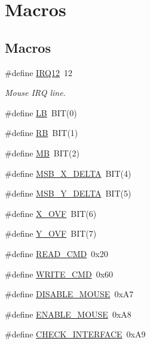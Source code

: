 \hypertarget{group__Mouse}{}\section{Macros}
\label{group__Mouse}
\subsection*{Macros}
\begin{DoxyCompactItemize}
\item 
\#define \hyperlink{group__Mouse_ga57276d1481230d81d2bba849f935ce5a}{I\+R\+Q12}~12
\begin{DoxyCompactList}\small\item\em Mouse I\+RQ line. \end{DoxyCompactList}\item 
\#define \hyperlink{group__Mouse_gacc55daa58d88a3612f2ef74a6abbe97f}{LB}~B\+IT(0)
\item 
\#define \hyperlink{group__Mouse_ga171160a766f85c8816b898ed24d28408}{RB}~B\+IT(1)
\item 
\#define \hyperlink{group__Mouse_gaa6b38d492364d98453284934ed7caee9}{MB}~B\+IT(2)
\item 
\#define \hyperlink{group__Mouse_gab3682a7593eea6b3a98269c3105714b1}{M\+S\+B\+\_\+\+X\+\_\+\+D\+E\+L\+TA}~B\+IT(4)
\item 
\#define \hyperlink{group__Mouse_ga73e7f39e782c9d57707ff7a518d031a6}{M\+S\+B\+\_\+\+Y\+\_\+\+D\+E\+L\+TA}~B\+IT(5)
\item 
\#define \hyperlink{group__Mouse_ga858379c2252a71bc12dd9ff796477d90}{X\+\_\+\+O\+VF}~B\+IT(6)
\item 
\#define \hyperlink{group__Mouse_ga8238446128710bc20d7c73b2fa785c72}{Y\+\_\+\+O\+VF}~B\+IT(7)
\item 
\#define \hyperlink{group__Mouse_ga21623e2a5501c821da54dd76ffc1d077}{R\+E\+A\+D\+\_\+\+C\+MD}~0x20
\item 
\#define \hyperlink{group__Mouse_gaf792feb13ae0c1eab8f95f64c8baa96d}{W\+R\+I\+T\+E\+\_\+\+C\+MD}~0x60
\item 
\#define \hyperlink{group__Mouse_ga12d3b0abea66d191d47fe6860e58865e}{D\+I\+S\+A\+B\+L\+E\+\_\+\+M\+O\+U\+SE}~0x\+A7
\item 
\#define \hyperlink{group__Mouse_ga618bdf461c25d552e654d6b899de2d37}{E\+N\+A\+B\+L\+E\+\_\+\+M\+O\+U\+SE}~0x\+A8
\item 
\#define \hyperlink{group__Mouse_gaa0f1fba85fccf224b75745c6c1552a45}{C\+H\+E\+C\+K\+\_\+\+I\+N\+T\+E\+R\+F\+A\+CE}~0x\+A9

\end{DoxyCompactItemize}
